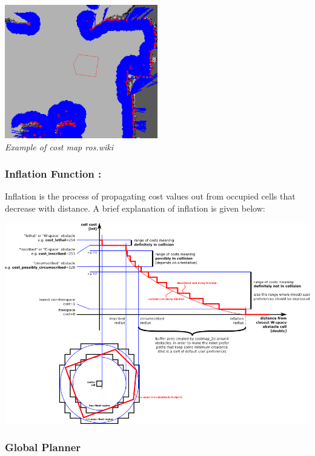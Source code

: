\documentclass[10pt,a4paper]{article}
\begin{document}
\begin{center}
\includegraphics[width=0.5\textwidth]{images/costmap.png}\\
\textit{Example of cost map ros.wiki} \\
\end{center}


\subsubsection{Inflation Function :}
Inflation is the process of propagating cost values out from occupied cells that decrease with distance. A brief explanation of inflation is given below:\\

\begin{center}
\includegraphics[width=\textwidth]{images/inflation.png}\\
\end{center}

\subsubsection{Global Planner}
\end{document}
